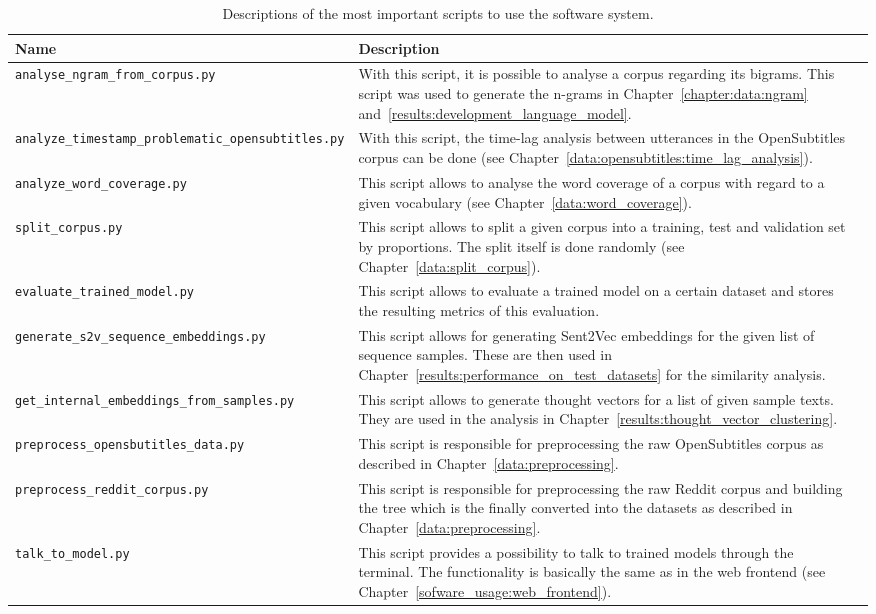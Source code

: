 \begin{table}[H]
	\centering
	\begin{adjustbox}{max width=\textwidth}
		\begin{tabular}{lp{8cm}p{8cm}}
			\toprule
			Name & Description\\ \midrule
			\texttt{analyse{\_}ngram{\_}from{\_}corpus.py} & With this script, it is possible to analyse a corpus regarding its bigrams. This script was used to generate the n-grams in Chapter~\ref{chapter:data:ngram} and~\ref{results:development_language_model}.\\
			\texttt{analyze{\_}timestamp{\_}problematic{\_}opensubtitles.py} & With this script, the time-lag analysis between utterances in the OpenSubtitles corpus can be done (see Chapter~\ref{data:opensubtitles:time_lag_analysis}).\\
			\texttt{analyze{\_}word{\_}coverage.py} & This script allows to analyse the word coverage of a corpus with regard to a given vocabulary (see Chapter~\ref{data:word_coverage}).\\
			\texttt{split{\_}corpus.py} & This script allows to split a given corpus into a training, test and validation set by proportions. The split itself is done randomly (see Chapter~\ref{data:split_corpus}).\\
			\texttt{evaluate{\_}trained{\_}model.py} & This script allows to evaluate a trained model on a certain dataset and stores the resulting metrics of this evaluation.\\
			\texttt{generate{\_}s2v{\_}sequence{\_}embeddings.py} & This script allows for generating Sent2Vec embeddings for the given list of sequence samples. These are then used in Chapter~\ref{results:performance_on_test_datasets} for the similarity analysis.\\
			\texttt{get{\_}internal{\_}embeddings{\_}from{\_}samples.py} & This script allows to generate thought vectors for a list of given sample texts. They are used in the analysis in Chapter~\ref{results:thought_vector_clustering}.\\
			\texttt{preprocess{\_}opensbutitles{\_}data.py} & This script is responsible for preprocessing the raw OpenSubtitles corpus as described in Chapter~\ref{data:preprocessing}.\\
			\texttt{preprocess{\_}reddit{\_}corpus.py} & This script is responsible for preprocessing the raw Reddit corpus and building the tree which is the finally converted into the datasets as described in Chapter~\ref{data:preprocessing}.\\
			\texttt{talk{\_}to{\_}model.py} & This script provides a possibility to talk to trained models through the terminal. The functionality is basically the same as in the web frontend (see Chapter~\ref{sofware_usage:web_frontend}).\\
			\bottomrule
		\end{tabular}
	\end{adjustbox}
	\caption{Descriptions of the most important scripts to use the software system.}
\end{table}

